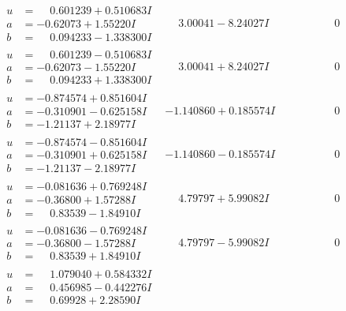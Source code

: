 \documentclass[1p]{elsarticle_modified}
\theoremstyle{definition}
\begin{document}
$$\begin{array}{c|c|c}
\begin{aligned}
u &= \phantom{-}0.601239 + 0.510683 I \\
a &= -0.62073 + 1.55220 I \\
b &= \phantom{-}0.094233 - 1.338300 I\end{aligned}
 & \phantom{-}3.00041 - 8.24027 I & \phantom{-0.000000 } 0 \\ \hline\begin{aligned}
u &= \phantom{-}0.601239 - 0.510683 I \\
a &= -0.62073 - 1.55220 I \\
b &= \phantom{-}0.094233 + 1.338300 I\end{aligned}
 & \phantom{-}3.00041 + 8.24027 I & \phantom{-0.000000 } 0 \\ \hline\begin{aligned}
u &= -0.874574 + 0.851604 I \\
a &= -0.310901 - 0.625158 I \\
b &= -1.21137 + 2.18977 I\end{aligned}
 & -1.140860 + 0.185574 I & \phantom{-0.000000 } 0 \\ \hline\begin{aligned}
u &= -0.874574 - 0.851604 I \\
a &= -0.310901 + 0.625158 I \\
b &= -1.21137 - 2.18977 I\end{aligned}
 & -1.140860 - 0.185574 I & \phantom{-0.000000 } 0 \\ \hline\begin{aligned}
u &= -0.081636 + 0.769248 I \\
a &= -0.36800 + 1.57288 I \\
b &= \phantom{-}0.83539 - 1.84910 I\end{aligned}
 & \phantom{-}4.79797 + 5.99082 I & \phantom{-0.000000 } 0 \\ \hline\begin{aligned}
u &= -0.081636 - 0.769248 I \\
a &= -0.36800 - 1.57288 I \\
b &= \phantom{-}0.83539 + 1.84910 I\end{aligned}
 & \phantom{-}4.79797 - 5.99082 I & \phantom{-0.000000 } 0 \\ \hline\begin{aligned}
u &= \phantom{-}1.079040 + 0.584332 I \\
a &= \phantom{-}0.456985 - 0.442276 I \\
b &= \phantom{-}0.69928 + 2.28590 I\end{aligned}

\end{array}$$
\end{document}
